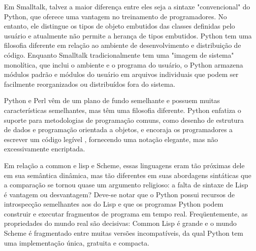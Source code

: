Em Smalltalk, talvez a maior diferença entre eles seja a sintaxe "convencional" do Python, que oferece uma vantagem no treinamento de programadores.
No entanto, ele distingue os tipos de objeto embutidos das classes definidas pelo usuário e atualmente não permite a herança de tipos embutidos.
Python tem uma filosofia diferente em relação ao ambiente de desenvolvimento e distribuição de código. Enquanto Smalltalk tradicionalmente tem uma "imagem de sistema" monolítica, que inclui o ambiente e o programa do usuário, o Python armazena módulos padrão e módulos do usuário em arquivos individuais que podem ser facilmente reorganizados ou distribuídos fora do sistema.

Python e Perl vêm de um plano de fundo semelhante e possuem muitas características semelhantes, mas têm uma filosofia diferente.
Python enfatiza o suporte para metodologias de programação comuns, como desenho de estrutura de dados e programação orientada a objetos, e encoraja os programadores a escrever um código legível , fornecendo uma notação elegante, mas não excessivamente encriptada.

Em relação a common e lisp e Scheme, essas linguagens eram tão próximas dele em sua semântica dinâmica, mas tão diferentes em suas abordagens sintáticas que a comparação se tornou quase um argumento religioso: a falta de sintaxe de Lisp é vantagem ou desvantagem?
Deve-se notar que o Python possui recursos de introspecção semelhantes aos do Lisp e que os programas Python podem construir e executar fragmentos de programa em tempo real. Freqüentemente, as propriedades do mundo real são decisivas:
Common Lisp é grande e o mundo Scheme é fragmentado entre muitas versões incompatíveis, da qual Python tem uma implementação única, gratuita e compacta.

 
